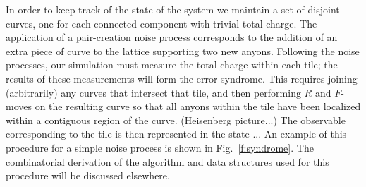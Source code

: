 \documentclass[aps, prl, letterpaper, twocolumn, superscriptaddress, notitlepage, 10pt]{revtex4}
\newcommand{\Fref}[1]{Fig.~\ref{#1}}
\newcommand{\cggb}[1]{\textcolor{blue}{#1}}
\begin{document}
In order to keep track of the state of the system we maintain a set of disjoint curves, 
one for each connected component with trivial total charge.
The application of a pair-creation noise process corresponds to the 
addition of an extra piece of curve to the lattice supporting
two new anyons.
Following the noise processes, our simulation must %
measure the total charge within each tile; the results of 
these measurements will form the error syndrome. 
This requires joining (arbitrarily) any curves that intersect that tile, 
and then performing $R$ and $F$-moves on the resulting
curve so that 
all anyons within the tile have been 
localized within a contiguous region of the curve. 
(Heisenberg picture...)
The observable corresponding to the tile is then
represented in the state ...
An example of this 
procedure for a simple noise process is shown in \Fref{f:syndrome}.
The combinatorial derivation of the algorithm and data structures used for 
this procedure will be discussed elsewhere.
\end{document}
